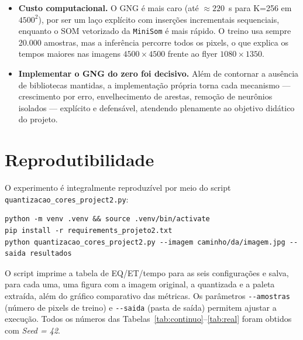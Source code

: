 \documentclass[11pt,a4paper]{article}
\begin{document}
\begin{itemize}
    \item \textbf{Custo computacional.} O GNG é mais caro (até $\approx 220$~s para K=256 em $4500^2$), por ser um laço explícito com inserções incrementais sequenciais, enquanto o SOM vetorizado da \texttt{MiniSom} é mais rápido. O treino usa sempre 20.000 amostras, mas a inferência percorre todos os pixels, o que explica os tempos maiores nas imagens $4500\times4500$ frente ao flyer $1080\times1350$.

    \item \textbf{Implementar o GNG do zero foi decisivo.} Além de contornar a ausência de bibliotecas mantidas, a implementação própria torna cada mecanismo --- crescimento por erro, envelhecimento de arestas, remoção de neurônios isolados --- explícito e defensável, atendendo plenamente ao objetivo didático do projeto.
\end{itemize}

\section{Reprodutibilidade}

O experimento é integralmente reproduzível por meio do script \texttt{quantizacao\_cores\_project2.py}:

\begin{verbatim}
python -m venv .venv && source .venv/bin/activate
pip install -r requirements_projeto2.txt
python quantizacao_cores_project2.py --imagem caminho/da/imagem.jpg --saida resultados
\end{verbatim}

O script imprime a tabela de EQ/ET/tempo para as seis configurações e salva, para cada uma, uma figura com a imagem original, a quantizada e a paleta extraída, além do gráfico comparativo das métricas. Os parâmetros \texttt{-{}-amostras} (número de pixels de treino) e \texttt{-{}-saida} (pasta de saída) permitem ajustar a execução. Todos os números das Tabelas~\ref{tab:continuo}--\ref{tab:real} foram obtidos com \textit{Seed = 42}.
\end{document}

